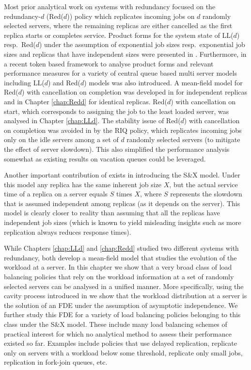 \documentclass[12pt]{report}
\begin{document}
Most prior analytical work on systems with redundancy focused on the
redundancy-$d$ (Red($d$)) policy which replicates incoming jobs on $d$ randomly 
selected servers, where the remaining replicas are either cancelled as the
first replica starts or completes service. 
Product forms for the system state of LL($d$) resp.~Red($d$)
under the assumption of exponential job sizes resp.~exponential job sizes and replicas that have independent sizes were presented in \cite{Ayesta18,gardnerOR}. Furthermore, in \cite{Ayesta19} a recent token based framework to analyse product forms and relevant performance measures for a variety of central queue based multi server models including LL($d$) and Red($d$) models was also introduced. A mean-field model for
Red($d$) with
cancellation on completion was developed in \cite{gardnerOR} for independent
replicas and in Chapter \ref{chap:Redd} for identical replicas.
Red($d$) with cancellation on start, which corresponds to assigning the job to the least
loaded server, was analysed in Chapter \ref{chap:LLd}. 
The stability issue of Red($d$) with cancellation on completion 
was avoided in \cite{gardner1} by the RIQ policy, which replicates incoming jobs only 
on the idle servers among a set of $d$ randomly selected servers 
(to mitigate the effect of server slowdown). This also simplified the performance analysis 
somewhat as existing results on vacation queues could be leveraged.


Another important contribution of \cite{gardner1} exists in introducing
the S\&X model. Under this model
any replica has the same inherent job size $X$, but the actual service time of a replica
on a server equals $S$ times $X$, where $S$ represents the slowdown that 
is assumed independent among replicas (as it depends on the server).
This model is clearly closer to reality than assuming that all the replicas have
independent job sizes (which is known to yield misleading insights such as more
replication always reduces response times). 

While Chapters \ref{chap:LLd} and \ref{chap:Redd} studied two 
different systems with redundancy, both develop a mean-field model
that studies the evolution of the workload at a server. In this chapter we
show that a very broad class of load balancing policies that rely on 
the workload information at a set of randomly selected servers can be
analysed in a unified manner. More specifically, using the cavity process introduced in \cite{bramsonLB}
we show that the workload
distribution at a server is the solution of an FDE under the
assumption of asymptotic independence. We further study this
FDE for a variety of load balancing policies belonging to this class
under the S\&X model.
These include many load balancing schemes of practical interest for which
no analytical method to assess their performance existed so far.
Examples include policies that use delayed replication, replicate only on servers
with a workload below some threshold, replicate only small jobs, 
replication in fork-join queues, etc.    
\end{document}
